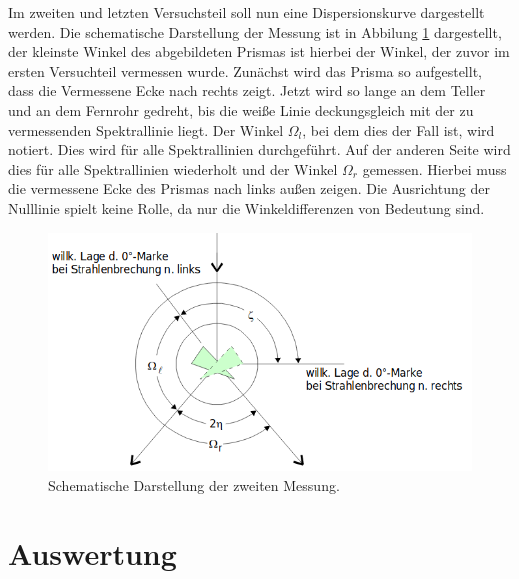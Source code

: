 Im zweiten und letzten Versuchsteil soll nun eine Dispersionskurve dargestellt werden. Die schematische Darstellung der Messung ist in Abbilung \ref{abb:4} dargestellt,
der kleinste Winkel des abgebildeten Prismas ist hierbei der Winkel, der zuvor im ersten Versuchteil vermessen wurde. Zunächst wird das Prisma so aufgestellt, dass
die Vermessene Ecke nach rechts zeigt. Jetzt wird so lange an dem Teller und an dem Fernrohr gedreht, bis die weiße Linie deckungsgleich mit der zu vermessenden
Spektrallinie liegt. Der Winkel $\Omega_l$, bei dem dies der Fall ist, wird notiert. Dies wird für alle Spektrallinien durchgeführt. Auf der anderen Seite wird dies
für alle Spektrallinien wiederholt und der Winkel $\Omega_r$ gemessen. Hierbei muss die vermessene Ecke des Prismas nach links außen zeigen. Die Ausrichtung der
Nulllinie spielt keine Rolle, da nur die Winkeldifferenzen von Bedeutung sind.

\begin{figure}
  \centering
  \includegraphics[scale=0.4]{4.png}
  \caption{Schematische Darstellung der zweiten Messung. \cite{Q1}}
  \label{abb:4}
\end{figure}

\section{Auswertung}
